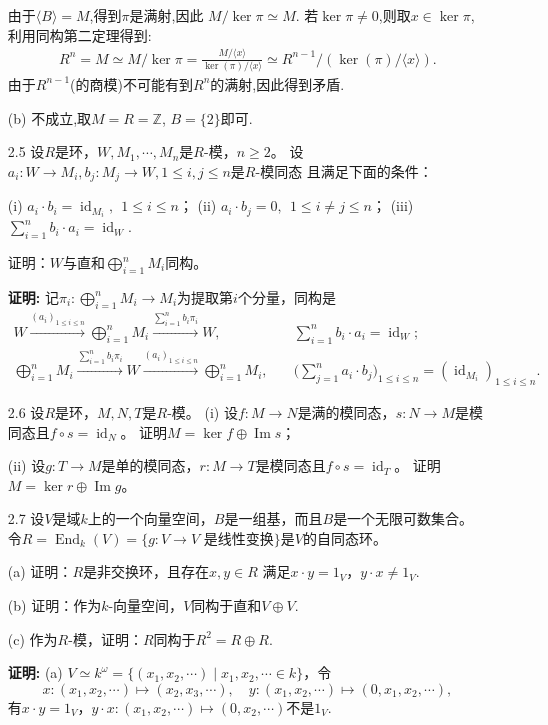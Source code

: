\begin{enumerate}
    由于$\langle B\rangle = M$,得到$\pi$是满射,因此
    $M/\ker \pi \simeq M$.
    若$\ker \pi \neq 0$,则取$x\in \ker\pi$,利用同构第二定理得到:
    \begin{align}
        R^n  = M \simeq M/\ker \pi = \frac{M/\langle x\rangle}{\ker(\pi) / \langle x\rangle} \simeq R^{n-1}/(\ker(\pi)/\langle x\rangle).
    \end{align}
    由于$R^{n-1}$(的商模)不可能有到$R^n$的满射,因此得到矛盾.
    \item[(b)]
    不成立,取$M=R=\mathbb{Z}$, $B=\{2\}$即可.

    \item[2.5]设$R$是环，$W,M_1,\cdots,M_n$是$R$-模，$n\ge2$。
    设$a_i:W\to M_i,b_j:M_j\to W,1\le i,j\le n$是$R$-模同态
    且满足下面的条件：

    (i) $a_i\cdot b_i=\operatorname{id}_{M_i},\ \ 1\le i\le n$；\quad
    (ii) $a_i\cdot b_j=0,\ \ 1\le i\ne j\le n$；\quad
    (iii) $\displaystyle \sum_{i=1}^n b_i\cdot a_i=\operatorname{id}_W$.

    证明：$W$与直和$\bigoplus_{i=1}^n M_i$同构。
    \item[\textbf{证明:}]
    记$\pi_i\colon \bigoplus_{i=1}^n M_i \to M_i$为提取第$i$个分量，同构是
    \begin{align*}
        W\xrightarrow{(a_i)_{1\le i\le n}}
        \bigoplus_{i=1}^n M_i\xrightarrow{\sum_{i=1}^n b_i\pi_i} W,
        &\quad \sum_{i=1}^n b_i\cdot a_i=\operatorname{id}_W;\\
        \bigoplus_{i=1}^n M_i\xrightarrow{\sum_{i=1}^n b_i\pi_i} W
        \xrightarrow{(a_i)_{1\le i\le n}} \bigoplus_{i=1}^n M_i,
        &\quad \Big(\sum_{j=1}^n a_i\cdot b_j\Big)_{1\le i\le n}
        =(\operatorname{id}_{M_i})_{1\le i\le n}.
    \end{align*}

    \item[2.6]设$R$是环，$M,N,T$是$R$-模。
    (i) 设$f:M \to N$是满的模同态，$s:N \to M$是模同态且$f \circ s=\operatorname{id}_N$。
    证明$M=\ker f\oplus\operatorname{Im}s$；

    (ii) 设$g:T \to M$是单的模同态，$r:M \to T$是模同态且$f \circ s=\operatorname{id}_T$。
    证明$M=\ker r\oplus\operatorname{Im}g$。

    \item[2.7]设$V$是域$k$上的一个向量空间，$B$是一组基，而且$B$是一个无限可数集合。
    令$R=\operatorname{End}_k(V)=\{g:V\to V\text{ 是线性变换}\}$是$V$的自同态环。
    \item[(a)]证明：$R$是非交换环，且存在$x,y\in R$
    满足$x\cdot y=1_V$，$y\cdot x\ne1_V$.
    \item[(b)]证明：作为$k$-向量空间，$V$同构于直和$V\oplus V$.
    \item[(c)] 作为$R$-模，证明：$R$同构于$R^2=R\oplus R$.
    \item[\textbf{证明:}]
    (a) $V\simeq k^\omega=\{(x_1,x_2,\cdots)\mid x_1,x_2,\cdots\in k\}$，令
    $$x\colon(x_1,x_2,\cdots)\mapsto(x_2,x_3,\cdots),
    \quad y\colon(x_1,x_2,\cdots)\mapsto(0,x_1,x_2,\cdots),$$
    有$x\cdot y=1_V$，$y\cdot x\colon(x_1,x_2,\cdots)\mapsto(0,x_2,\cdots)$不是$1_V$.


\end{enumerate}
